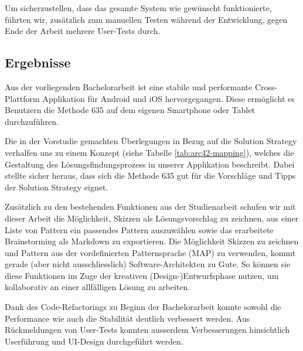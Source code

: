 Um sicherzustellen, dass das gesamte System wie gewünscht funktionierte, führten wir, zusätzlich zum manuellen Testen während der Entwicklung, gegen Ende der Arbeit mehrere User-Tests durch.

\subsection{Ergebnisse}
Aus der vorliegenden Bachelorarbeit ist eine stabile und performante Cross-Plattform Applikation für Android und iOS hervorgegangen. Diese ermöglicht es Benutzern die Methode 635 auf dem eigenen Smartphone oder Tablet durchzuführen.

Die in der Vorstudie gemachten Überlegungen in Bezug auf die Solution Strategy verhalfen uns zu einem Konzept (siehe Tabelle \ref{tab:arc42-mapping}), welches die Gestaltung des Lösungs\-findungs\-prozess in unserer Applikation beschreibt. Dabei stellte sicher heraus, dass sich die Methode 635 gut für die Vorschläge und Tipps der Solution Strategy eignet. 

Zusätzlich zu den bestehenden Funktionen aus der Studienarbeit schufen wir mit dieser Arbeit die Möglichkeit, Skizzen als Lösungsvorschlag zu zeichnen, aus einer Liste von Pattern ein passendes Pattern auszuwählen sowie das erarbeitete Brainstorming als Markdown zu exportieren. Die Möglichkeit Skizzen zu zeichnen und Pattern aus der vordefinierten Patternsprache (MAP) zu verwenden, kommt gerade (aber nicht ausschliesslich) Software-Architekten zu Gute. So können sie diese Funktionen im Zuge der kreativen (Design-)Entwurfsphase nutzen, um kollaborativ an einer allfälligen Lösung zu arbeiten.

Dank des Code-Refactorings zu Beginn der Bachelorarbeit konnte sowohl die Performance wie auch die Stabilität deutlich verbessert werden. Aus Rückmeldungen von User-Tests konnten ausserdem Verbesserungen hinsichtlich Userführung und UI-Design durchgeführt werden.